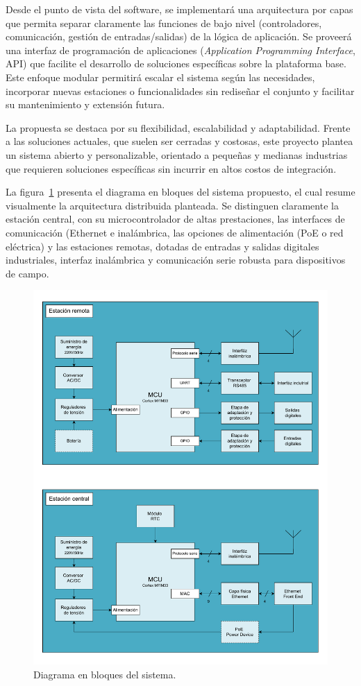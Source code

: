 \documentclass[
11pt, %
]{charter}
\begin{document}
Desde el punto de vista del software, se implementará una arquitectura por capas que permita separar claramente las funciones de bajo nivel (controladores, comunicación, gestión de entradas/salidas) de la lógica de aplicación. Se proveerá una interfaz de programación de aplicaciones (\textit{Application Programming Interface}, API) que facilite el desarrollo de soluciones específicas sobre la plataforma base. Este enfoque modular permitirá escalar el sistema según las necesidades, incorporar nuevas estaciones o funcionalidades sin rediseñar el conjunto y facilitar su mantenimiento y extensión futura.

La propuesta se destaca por su flexibilidad, escalabilidad y adaptabilidad. Frente a las soluciones actuales, que suelen ser cerradas y costosas, este proyecto plantea un sistema abierto y personalizable, orientado a pequeñas y medianas industrias que requieren soluciones específicas sin incurrir en altos costos de integración.

\newpage
La figura \ref{fig:diagBloques} presenta el diagrama en bloques del sistema propuesto, el cual resume visualmente la arquitectura distribuida planteada. Se distinguen claramente la estación central, con su microcontrolador de altas prestaciones, las interfaces de comunicación (Ethernet e inalámbrica, las opciones de alimentación (PoE o red eléctrica) y las estaciones remotas, dotadas de entradas y salidas digitales industriales, interfaz inalámbrica y comunicación serie robusta para dispositivos de campo.

\begin{figure}[htpb]
\centering 
\includegraphics[width=.9\textwidth]{./Figuras/diagBloques.pdf}
\caption{Diagrama en bloques del sistema.}
\label{fig:diagBloques}
\end{figure}
\end{document}
